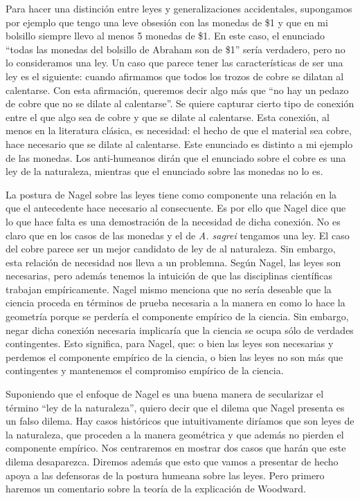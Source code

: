 Para hacer una distinción entre leyes y generalizaciones accidentales, supongamos por ejemplo que tengo una leve obsesión con las monedas de \$1 y que en mi bolsillo siempre llevo al menos 5 monedas de \$1. En este caso, el enunciado ``todas las monedas del bolsillo de Abraham son de \$1'' sería verdadero, pero no lo consideramos una ley. Un caso que parece tener las características de ser una ley es el siguiente: cuando afirmamos que todos los trozos de cobre se dilatan al calentarse.  Con esta afirmación, queremos decir algo más que ``no hay un pedazo de cobre que no se dilate al calentarse''. Se quiere capturar cierto tipo de conexión entre el que algo sea de cobre y que se dilate al calentarse. Esta conexión, al menos en la literatura clásica, es necesidad: el hecho de que el material sea cobre, hace necesario que se dilate al calentarse. Este enunciado es distinto a mi ejemplo de las monedas. Los anti-humeanos dirán que el enunciado sobre el cobre es una ley de la naturaleza, mientras que el enunciado sobre las monedas no lo es.

La postura de Nagel sobre las leyes tiene como componente una relación en la que el antecedente hace necesario al consecuente. Es por ello que Nagel dice que lo que hace falta es una demostración de la necesidad de dicha conexión. No es claro que en los casos de las monedas y el de \emph{A. sagrei} tengamos una ley. El caso del cobre parece ser un mejor candidato de ley de al naturaleza. Sin embargo, esta relación de necesidad nos lleva a un problemna. Según Nagel, las leyes son necesarias, pero además tenemos la intuición de que las disciplinas científicas trabajan empíricamente. Nagel mismo menciona que no sería deseable que la ciencia proceda en términos de prueba necesaria a la manera en como lo hace la geometría \cite[cfr., p. 53]{Nagel2006} porque se perdería el componente empírico de la ciencia. Sin embargo, negar dicha conexión necesaria implicaría que la ciencia se ocupa sólo de verdades contingentes. Esto significa, para Nagel, que: o bien las leyes son necesarias y perdemos el componente empírico de la ciencia, o bien las leyes no son más que contingentes y mantenemos el compromiso empírico de la ciencia.

Suponiendo que el enfoque de Nagel es una buena manera de secularizar el término ``ley de la naturaleza'', quiero decir que el dilema que Nagel presenta es un falso dilema. Hay casos históricos que intuitivamente diríamos que son leyes de la naturaleza, que proceden a la manera geométrica y que además no pierden el componente empírico. Nos centraremos en mostrar dos casos que harán que este dilema desaparezca. Diremos además que esto que vamos a presentar de hecho apoya a las defensoras de la postura humeana sobre las leyes. Pero primero haremos un comentario sobre la teoría de la explicación de Woodward.

